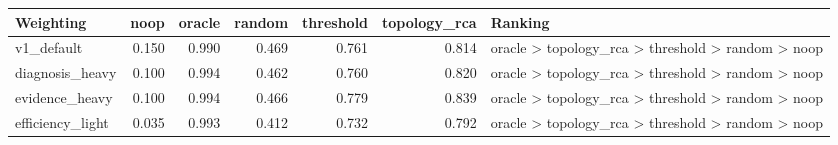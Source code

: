 \begin{tabular}{lrrrrrl}
\toprule
Weighting & noop & oracle & random & threshold & topology\_rca & Ranking \\
\midrule
v1\_default & 0.150 & 0.990 & 0.469 & 0.761 & 0.814 & oracle > topology\_rca > threshold > random > noop \\
diagnosis\_heavy & 0.100 & 0.994 & 0.462 & 0.760 & 0.820 & oracle > topology\_rca > threshold > random > noop \\
evidence\_heavy & 0.100 & 0.994 & 0.466 & 0.779 & 0.839 & oracle > topology\_rca > threshold > random > noop \\
efficiency\_light & 0.035 & 0.993 & 0.412 & 0.732 & 0.792 & oracle > topology\_rca > threshold > random > noop \\
\bottomrule
\end{tabular}
